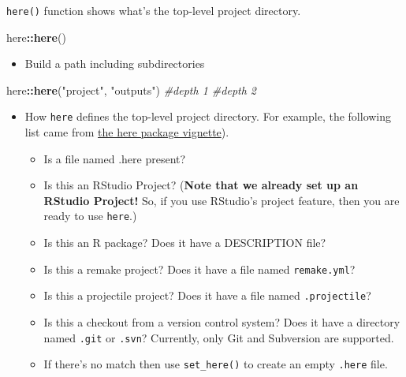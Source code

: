 \documentclass[
]{book}
\newenvironment{Shaded}{\begin{snugshade}}{\end{snugshade}}
\newcommand{\CommentTok}[1]{\textcolor[rgb]{0.56,0.35,0.01}{\textit{#1}}}
\newcommand{\FunctionTok}[1]{\textcolor[rgb]{0.13,0.29,0.53}{\textbf{#1}}}
\newcommand{\NormalTok}[1]{#1}
\newcommand{\SpecialCharTok}[1]{\textcolor[rgb]{0.81,0.36,0.00}{\textbf{#1}}}
\newcommand{\StringTok}[1]{\textcolor[rgb]{0.31,0.60,0.02}{#1}}
\providecommand{\tightlist}{%
  \setlength{\itemsep}{0pt}\setlength{\parskip}{0pt}}
\begin{document}
\texttt{here()} function shows what's the top-level project directory.

\begin{Shaded}
\begin{Highlighting}[]
\NormalTok{here}\SpecialCharTok{::}\FunctionTok{here}\NormalTok{()}
\end{Highlighting}
\end{Shaded}

\begin{itemize}
\tightlist
\item
  Build a path including subdirectories
\end{itemize}

\begin{Shaded}
\begin{Highlighting}[]
\NormalTok{here}\SpecialCharTok{::}\FunctionTok{here}\NormalTok{(}\StringTok{"project"}\NormalTok{, }\StringTok{"outputs"}\NormalTok{)}
           \CommentTok{\#depth 1   \#depth 2}
\end{Highlighting}
\end{Shaded}

\begin{itemize}
\item
  How \texttt{here} defines the top-level project directory. For example, the following list came from \href{https://GitHub.com/jennybc/here_here}{the here package vignette}).

  \begin{itemize}
  \item
    Is a file named .here present?
  \item
    Is this an RStudio Project? (\textbf{Note that we already set up an RStudio Project!} So, if you use RStudio's project feature, then you are ready to use \texttt{here}.)
  \item
    Is this an R package? Does it have a DESCRIPTION file?
  \item
    Is this a remake project? Does it have a file named \texttt{remake.yml}?
  \item
    Is this a projectile project? Does it have a file named \texttt{.projectile}?
  \item
    Is this a checkout from a version control system? Does it have a directory named \texttt{.git} or \texttt{.svn}? Currently, only Git and Subversion are supported.
  \item
    If there's no match then use \texttt{set\_here()} to create an empty \texttt{.here} file.
  \end{itemize}
\end{itemize}
\end{document}
